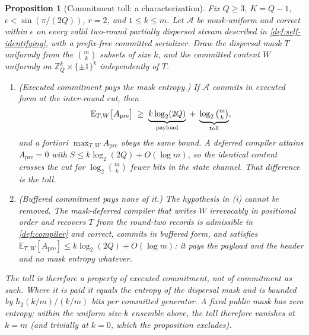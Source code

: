 \documentclass[a4paper,twocolumn,10pt,unpublished]{quantumarticle}
\newtheorem{proposition}{Proposition}
\begin{document}
\begin{proposition}[Commitment toll: a characterization]
\label{prop:commitment-toll}
Fix $Q\geq3$, $K=Q-1$, $\epsilon<\sin(\pi/(2Q))$, $r=2$, and
$1\leq k\leq m$.  Let $\mathcal A$ be mask-uniform and correct within
$\epsilon$ on every valid two-round partially dispersed stream described
in \cref{def:self-identifying}, with a prefix-free committed serializer.
Draw the dispersal mask $T$ uniformly from the
$\binom{m}{k}$ subsets of size $k$, and the committed content $W$
uniformly on $\mathbb Z_Q^k\times\{\pm1\}^k$ independently of $T$.
\begin{enumerate}[label=(\roman*),leftmargin=1.6em]
\item \emph{(Executed commitment pays the mask entropy.)}  If
$\mathcal A$ commits in executed form at the inter-round cut, then
\begin{equation}\label{eq:commitment-toll}
 \mathbb E_{T,W}\bigl[A_{\mathrm{pre}}\bigr]
 \;\geq\;\underbrace{k\log_2(2Q)}_{\text{payload}}
 \;+\;\underbrace{\log_2\tbinom{m}{k}}_{\text{toll}},
\end{equation}
and \emph{a fortiori} $\max_{T,W}A_{\mathrm{pre}}$ obeys the same
bound.  A deferred compiler attains $A_{\mathrm{pre}}=0$ with
$S\leq k\log_2(2Q)+O(\log m)$, so the identical content crosses the cut
for $\log_2\binom{m}{k}$ fewer bits in the state channel.  That
difference is the toll.
\item \emph{(Buffered commitment pays none of it.)}  The hypothesis in
(i) cannot be removed.  The mask-deferred compiler that writes $W$
irrevocably in positional order and recovers $T$ from the round-two
records is admissible in \cref{def:compiler} and correct, commits in
buffered form, and satisfies
$\mathbb E_{T,W}[A_{\mathrm{pre}}]\leq k\log_2(2Q)+O(\log m)$: it pays
the payload and the header and no mask entropy whatever.
\end{enumerate}
The toll is therefore a property of \emph{executed} commitment, not of
commitment as such.  Where it is paid it equals the entropy of the
dispersal mask and is bounded by $h_2(k/m)\big/(k/m)$ bits per
committed generator.  A fixed public mask has zero entropy; within the
uniform size-$k$ ensemble above, the toll therefore vanishes at $k=m$
(and trivially at $k=0$, which the proposition excludes).
\end{proposition}
\end{document}
